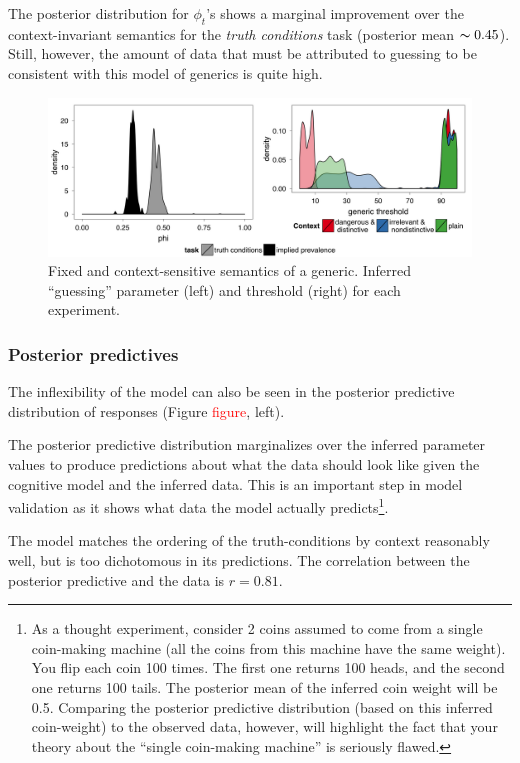 \documentclass[10pt,letterpaper]{article}
\newcommand{\red}[1]{\textcolor{Red}{#1}}
\begin{document}
The posterior distribution for $\phi_{t}$'s shows a marginal improvement over the context-invariant semantics for the \emph{truth conditions} task (posterior mean $\thicksim 0.45$). Still, however, the amount of data that must be attributed to guessing to be consistent with this model of generics is quite high.


\begin{figure}
\centering
    \includegraphics[width=\columnwidth]{fixed_phis_thetas}
    \caption{Fixed and context-sensitive semantics of a generic. Inferred ``guessing'' parameter (left) and threshold (right) for each experiment.}
  \label{fig:justFixed}
\end{figure}


\subsubsection{Posterior predictives}

The inflexibility of the model can also be seen in the posterior predictive distribution of responses (Figure \red{figure}, left). 

The posterior predictive distribution marginalizes over the inferred parameter values to produce predictions about what the data should look like given the cognitive model and the inferred data. This is an important step in model validation as it shows what data the model actually predicts\footnote{As a thought experiment, consider 2 coins assumed to come from a single coin-making machine (all the coins from this machine have the same weight). You flip each coin 100 times. The first one returns 100 heads, and the second one returns 100 tails. The posterior mean of the inferred coin weight will be 0.5. Comparing the posterior predictive distribution (based on this inferred coin-weight) to the observed data, however, will highlight the fact that your theory about the ``single coin-making machine'' is seriously flawed.}.

The model matches the ordering of the truth-conditions by context reasonably well, but is too dichotomous in its predictions. The correlation between the posterior predictive and the data is $r = 0.81$. 
\end{document}
